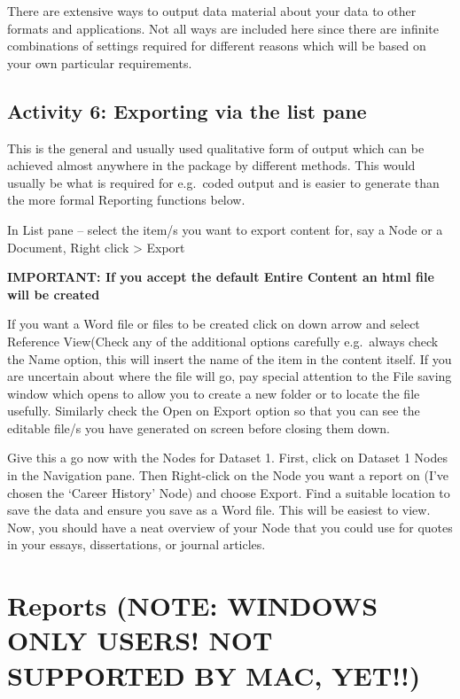 \documentclass[]{book}
\theoremstyle{definition}
\theoremstyle{definition}
\theoremstyle{definition}
\theoremstyle{remark}
\begin{document}
There are extensive ways to output data material about your data to
other formats and applications. Not all ways are included here since
there are infinite combinations of settings required for different
reasons which will be based on your own particular requirements.

\hypertarget{activity-6-exporting-via-the-list-pane}{%
\subsection{Activity 6: Exporting via the list
pane}\label{activity-6-exporting-via-the-list-pane}}

This is the general and usually used qualitative form of output which
can be achieved almost anywhere in the package by different methods.
This would usually be what is required for e.g.~coded output and is
easier to generate than the more formal Reporting functions below.

In List pane -- select the item/s you want to export content for, say a
Node or a Document, Right click \textgreater{} Export

\textbf{IMPORTANT: If you accept the default Entire Content an html file
will be created}

If you want a Word file or files to be created click on down arrow and
select Reference View(Check any of the additional options carefully
e.g.~always check the Name option, this will insert the name of the item
in the content itself. If you are uncertain about where the file will
go, pay special attention to the File saving window which opens to allow
you to create a new folder or to locate the file usefully. Similarly
check the Open on Export option so that you can see the editable file/s
you have generated on screen before closing them down.

Give this a go now with the Nodes for Dataset 1. First, click on Dataset
1 Nodes in the Navigation pane. Then Right-click on the Node you want a
report on (I've chosen the `Career History' Node) and choose Export.
Find a suitable location to save the data and ensure you save as a Word
file. This will be easiest to view. Now, you should have a neat overview
of your Node that you could use for quotes in your essays,
dissertations, or journal articles.

\hypertarget{reports-note-windows-only-users-not-supported-by-mac-yet}{%
\section{Reports (NOTE: WINDOWS ONLY USERS! NOT SUPPORTED BY MAC,
YET!!)}\label{reports-note-windows-only-users-not-supported-by-mac-yet}}
\end{document}
